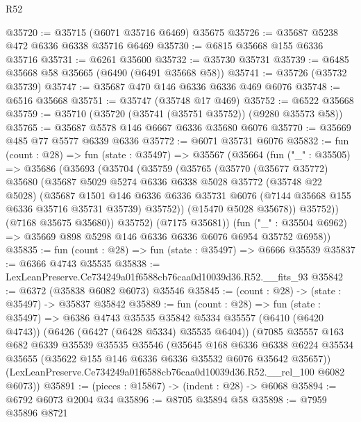 \begin{lexlean}{R52}
\begin{coremodule}
@35720 := @35715 (@6071 @35716 @6469) @35675
@35726 := @35687 @5238 @472 @6336 @6338 @35716 @6469
@35730 := @6815 @35668 @155 @6336 @35716
@35731 := @6261 @35600
@35732 := @35730 @35731
@35739 := @6485 @35668 @58 @35665 (@6490 (@6491 @35668 @58))
@35741 := @35726 (@35732 @35739)
@35747 := @35687 @470 @146 @6336 @6336 @469 @6076
@35748 := @6516 @35668
@35751 := @35747 (@35748 @17 @469)
@35752 := @6522 @35668
@35759 := @35710 (@35720 (@35741 (@35751 @35752)) (@9280 @35573 @58))
@35765 := @35687 @5578 @146 @6667 @6336 @35680 @6076
@35770 := @35669 @485 @77 @5577 @6339 @6336
@35772 := @6071 @35731 @6076
@35832 := fun (count : @28) =>
  fun (state : @35497) =>
  @35567
    (@35664
      (fun ("_" : @35505) =>
      @35686
        (@35693
          (@35704
            (@35759
              (@35765
                (@35770
                  (@35677 @35772)
                  @35680
                  (@35687
                    @5029
                    @5274
                    @6336
                    @6338
                    @5028
                    @35772
                    (@35748 @22 @5028)
                    (@35687
                      @1501
                      @146
                      @6336
                      @6336
                      @35731
                      @6076
                      (@7144 @35668 @155 @6336 @35716 @35731 @35739)
                      @35752))
                  (@15470 @5028 @35678))
                @35752))
            (@7168 @35675 @35680))
          @35752)
        (@7175 @35681))
      (fun ("_" : @35504 @6962) => @35669 @898 @5298 @146 @6336 @6336 @6076 @6954 @35752 @6958))
@35835 := fun (count : @28) => fun (state : @35497) => @6666 @35539
@35837 := @6366 @4743 @35535
@35838 := LexLeanPreserve.Ce734249a01f6588cb76caa0d10039d36.R52.__fits_93
@35842 := @6372 (@35838 @6082 @6073) @35546
@35845 := (count : @28) -> (state : @35497) -> @35837 @35842
@35889 := fun (count : @28) =>
  fun (state : @35497) =>
  @6386
    @4743
    @35535
    @35842
    @5334
    @35557
    (@6410 (@6420 @4743))
    (@6426 (@6427 (@6428 @5334) @35535 @6404))
    (@7085
      @35557
      @163
      @682
      @6339
      @35539
      @35535
      @35546
      (@35645
        @168
        @6336
        @6338
        @6224
        @35534
        @35655
        (@35622 @155 @146 @6336 @6336 @35532 @6076 @35642 @35657))
      (LexLeanPreserve.Ce734249a01f6588cb76caa0d10039d36.R52.__rel_100 @6082 @6073))
@35891 := (pieces : @15867) -> (indent : @28) -> @6068
@35894 := @6792 @6073 @2004 @34
@35896 := @8705 @35894 @58
@35898 := @7959 @35896 @8721

\end{coremodule}
\end{lexlean}
